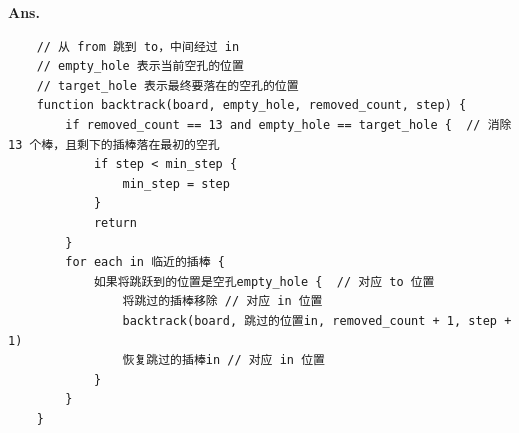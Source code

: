\documentclass[12pt, a4paper, UTF8, fontset=windows]{ctexbook}
\newenvironment{solution}{\par\noindent\textbf{Ans.}}{\par}
\begin{document}
\begin{solution}
    \begin{lstlisting}
    // 从 from 跳到 to，中间经过 in
    // empty_hole 表示当前空孔的位置
    // target_hole 表示最终要落在的空孔的位置
    function backtrack(board, empty_hole, removed_count, step) {
        if removed_count == 13 and empty_hole == target_hole {  // 消除 13 个棒，且剩下的插棒落在最初的空孔
            if step < min_step {
                min_step = step
            }
            return
        }
        for each in 临近的插棒 {
            如果将跳跃到的位置是空孔empty_hole {  // 对应 to 位置
                将跳过的插棒移除 // 对应 in 位置
                backtrack(board, 跳过的位置in, removed_count + 1, step + 1)
                恢复跳过的插棒in // 对应 in 位置
            }
        }
    }
    \end{lstlisting}

\end{solution}
\end{document}
